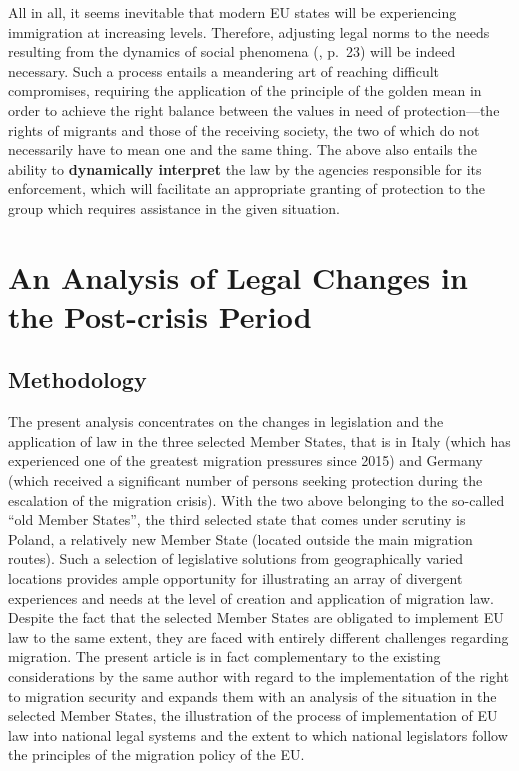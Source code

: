 \documentclass[10pt,a4paper]{article}
\begin{document}
\begin{multicols}{2}
All in all, it seems inevitable that modern EU states will be experiencing immigration at increasing levels. Therefore, adjusting legal norms to the needs resulting from the dynamics of social phenomena (\citep{R28}, p.~23) will be indeed necessary. Such a process entails a meandering art of reaching difficult compromises, requiring the application of the principle of the golden mean in order to achieve the right balance between the values in need of protection---the rights of migrants and those of the receiving society, the two of which do not necessarily have to mean one and the same thing. The above also entails the ability to \textbf{dynamically interpret} the law by the agencies responsible for its enforcement, which will facilitate an appropriate granting of protection to the group which requires assistance in the given situation.

\section{An Analysis of Legal Changes in the Post-crisis Period} 

\subsection{Methodology}

\noindent The present analysis concentrates on the changes in legislation and the application of law in the three selected Member States, that is in Italy (which has experienced one of the greatest migration pressures since 2015) and Germany (which received a significant number of persons seeking protection during the escalation of the migration crisis). With the two above belonging to the so-called ``old Member States'', the third selected state that comes under scrutiny is Poland, a relatively new Member State (located outside the main migration routes). Such a selection of legislative solutions from geographically varied locations provides ample opportunity for illustrating an array of divergent experiences and needs at the level of creation and application of migration law. Despite the fact that the selected Member States are obligated to implement EU law to the same extent, they are faced with entirely different challenges regarding migration. The present article is in fact complementary to the existing considerations by the same author with regard to the implementation of the right to migration security and expands them with an analysis of the situation in the selected Member States, the illustration of the process of implementation of EU law into national legal systems and the extent to which national legislators follow the principles of the migration policy of the EU.


\end{multicols}
\end{document}
